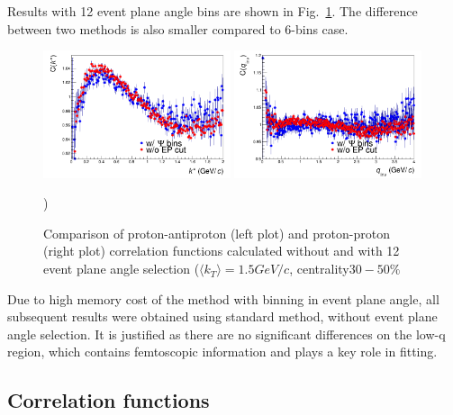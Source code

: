 Results with 12 event plane angle bins are shown in Fig.~\ref{psi12}. The difference between two methods is also smaller compared to 6-bins case.
\clearpage
\begin{figure}%
  \centering
  \includegraphics[width=0.49\textwidth]{pap_12psibins_3050_kt1.png}
  \includegraphics[width=0.49\textwidth]{pp_12psibins_3050_kt1.png}
  \caption{Comparison of proton-antiproton (left plot) and proton-proton (right plot) correlation functions calculated without and with 12 event plane angle selection ($\langle k_T \rangle = 1.5 GeV/c$, centrality$30-50 \%$})
  \label{psi12}
\end{figure}

Due to high memory cost of the method with binning in event plane angle, all subsequent results were obtained using standard method, without event plane angle selection. It is justified as there are no significant differences on the low-q region, which contains femtoscopic information and plays a key role in fitting.

\subsection{Correlation functions}
\label{sec:results}

